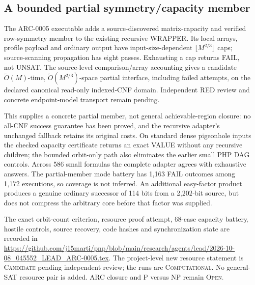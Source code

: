 \subsection{A bounded partial symmetry/capacity member}
The ARC-0005 executable adds a source-discovered matrix-capacity and verified
row-symmetry member to the existing recursive WRAPPER. Its local arrays,
profile payload and ordinary output have input-size-dependent
$\lfloor M^{2/3}\rfloor$ caps; source-scanning propagation has eight passes.
Exhausting a cap returns FAIL, not UNSAT. The source-level comparison/array
accounting gives a candidate $\widetilde O(M)$-time,
$\widetilde O(M^{2/3})$-space partial interface, including failed attempts,
on the declared canonical read-only indexed-CNF domain. Independent RED
review and concrete endpoint-model transport remain pending.

This supplies a concrete partial member, not general achievable-region
closure: no all-CNF success guarantee has been proved, and the recursive
adapter's unchanged fallback retains its original costs. On standard dense
pigeonhole inputs the checked capacity certificate returns an exact VALUE
without any recursive children; the bounded orbit-only path also eliminates
the earlier small PHP DAG controls. Across 586 small formulas the complete
adapter agrees with exhaustive answers. The partial-member mode battery has
1,163 FAIL outcomes among 1,172 executions, so coverage is not inferred.
An additional easy-factor product produces a genuine ordinary successor of
114 bits from a 2,202-bit source, but does not compress the arbitrary core
before that factor was supplied.

The exact orbit-count criterion, resource proof attempt, 68-case capacity
battery, hostile controls, source recovery, code hashes and synchronization
state are recorded in
\url{https://github.com/j15marti/pnp/blob/main/research/agents/lead/2026-10-08_045552_LEAD_ARC-0005.tex}.
The project-level new resource statement is \textsc{Candidate} pending
independent review; the runs are \textsc{Computational}. No general-SAT
resource pair is added. ARC closure and P versus NP remain \textsc{Open}.
